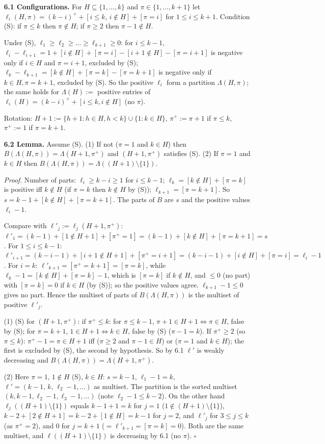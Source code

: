 \documentclass[11pt]{article}
\begin{document}
\textbf{6.1 Configurations.} For $H\subseteq\{1,\dots,k\}$ and $\pi\in\{1,\dots,k+1\}$ let $\ell_i(H,\pi)=(k-i)^++[i\le k,\,i\notin H]+[\pi=i]$ for $1\le i\le k+1$. Condition (S): if $\pi\le k$ then $\pi\notin H$; if $\pi\ge2$ then $\pi-1\notin H$.

Under (S), $\ell_1\ge\ell_2\ge\dots\ge\ell_{k+1}\ge0$: for $i\le k-1$, $\ell_i-\ell_{i+1}=1+[i\notin H]+[\pi=i]-[i+1\notin H]-[\pi=i+1]$ is negative only if $i\in H$ and $\pi=i+1$, excluded by (S); $\ell_k-\ell_{k+1}=[k\notin H]+[\pi=k]-[\pi=k+1]$ is negative only if $k\in H,\pi=k+1$, excluded by (S). So the positive $\ell_i$ form a partition $\Lambda(H,\pi)$; the same holds for $\Lambda(H):=$ positive entries of $\ell_i(H)=(k-i)^++[i\le k,i\notin H]$ (no $\pi$).

Rotation: $H+1:=\{h+1:h\in H,h<k\}\cup\{1:k\in H\}$, $\pi^+:=\pi+1$ if $\pi\le k$, $\pi^+:=1$ if $\pi=k+1$.

\textbf{6.2 Lemma.} Assume (S). (1) If not ($\pi=1$ and $k\in H$) then $B(\Lambda(H,\pi))=\Lambda(H+1,\pi^+)$ and $(H+1,\pi^+)$ satisfies (S). (2) If $\pi=1$ and $k\in H$ then $B(\Lambda(H,\pi))=\Lambda((H+1)\setminus\{1\})$.

\emph{Proof.} Number of parts: $\ell_i\ge k-i\ge1$ for $i\le k-1$; $\ell_k=[k\notin H]+[\pi=k]$ is positive iff $k\notin H$ (if $\pi=k$ then $k\notin H$ by (S)); $\ell_{k+1}=[\pi=k+1]$. So $s=k-1+[k\notin H]+[\pi=k+1]$. The parts of $B$ are $s$ and the positive values $\ell_i-1$.

Compare with $\ell'_j:=\ell_j(H+1,\pi^+)$: $\ell'_1=(k-1)+[1\notin H+1]+[\pi^+=1]=(k-1)+[k\notin H]+[\pi=k+1]=s$. For $1\le i\le k-1$: $\ell'_{i+1}=(k-i-1)+[i+1\notin H+1]+[\pi^+=i+1]=(k-i-1)+[i\notin H]+[\pi=i]=\ell_i-1$. For $i=k$: $\ell'_{k+1}=[\pi^+=k+1]=[\pi=k]$, while $\ell_k-1=[k\notin H]+[\pi=k]-1$, which is $[\pi=k]$ if $k\notin H$, and $\le0$ (no part) with $[\pi=k]=0$ if $k\in H$ (by (S)); so the positive values agree. $\ell_{k+1}-1\le0$ gives no part. Hence the multiset of parts of $B(\Lambda(H,\pi))$ is the multiset of positive $\ell'_j$.

(1) (S) for $(H+1,\pi^+)$: if $\pi^+\le k$: for $\pi\le k-1$, $\pi+1\in H+1\iff\pi\in H$, false by (S); for $\pi=k+1$, $1\in H+1\iff k\in H$, false by (S) ($\pi-1=k$). If $\pi^+\ge2$ (so $\pi\le k$): $\pi^+-1=\pi\in H+1$ iff ($\pi\ge2$ and $\pi-1\in H$) or ($\pi=1$ and $k\in H$); the first is excluded by (S), the second by hypothesis. So by 6.1 $\ell'$ is weakly decreasing and $B(\Lambda(H,\pi))=\Lambda(H+1,\pi^+)$.

(2) Here $\pi=1$, $1\notin H$ (S), $k\in H$: $s=k-1$, $\ell_1-1=k$, $\ell'=(k-1,\,k,\,\ell_2-1,\dots)$ as multiset. The partition is the sorted multiset $(k,k-1,\ell_2-1,\ell_3-1,\dots)$ (note $\ell_2-1\le k-2$). On the other hand $\ell_j((H+1)\setminus\{1\})$ equals $k-1+1=k$ for $j=1$ ($1\notin(H+1)\setminus\{1\}$), $k-2+[2\notin H+1]=k-2+[1\notin H]=k-1$ for $j=2$, and $\ell'_j$ for $3\le j\le k$ (as $\pi^+=2$), and $0$ for $j=k+1$ ($=\ell'_{k+1}=[\pi=k]=0$). Both are the same multiset, and $\ell((H+1)\setminus\{1\})$ is decreasing by 6.1 (no $\pi$). $\square$
\end{document}
